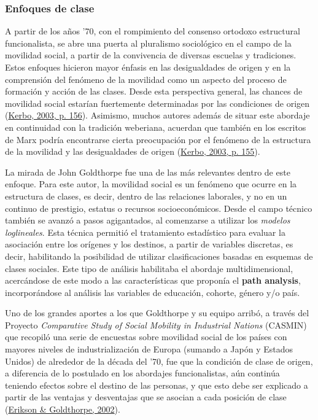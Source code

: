 \documentclass[
]{article}
\begin{document}
\hypertarget{enfoques-de-clase}{%
\subsubsection{Enfoques de clase}\label{enfoques-de-clase}}

A partir de los años '70, con el rompimiento del consenso ortodoxo estructural funcionalista, se abre una puerta al pluralismo sociológico en el campo de la movilidad social, a partir de la convivencia de diversas escuelas y tradiciones. Estos enfoques hicieron mayor énfasis en las desigualdades de origen y en la comprensión del fenómeno de la movilidad como un aspecto del proceso de formación y acción de las clases. Desde esta perspectiva general, las chances de movilidad social estarían fuertemente determinadas por las condiciones de origen (\protect\hyperlink{ref-Kerbo2003}{Kerbo, 2003, p. 156}). Asimismo, muchos autores además de situar este abordaje en continuidad con la tradición weberiana, acuerdan que también en los escritos de Marx podría encontrarse cierta preocupación por el fenómeno de la estructura de la movilidad y las desigualdades de origen (\protect\hyperlink{ref-Kerbo2003}{Kerbo, 2003, p. 155}).

La mirada de John Goldthorpe fue una de las más relevantes dentro de este enfoque. Para este autor, la movilidad social es un fenómeno que ocurre en la estructura de clases, es decir, dentro de las relaciones laborales, y no en un continuo de prestigio, estatus o recursos socioeconómicos. Desde el campo técnico también se avanzó a pasos agigantados, al comenzarse a utilizar los \emph{modelos loglineales}. Esta técnica permitió el tratamiento estadístico para evaluar la asociación entre los orígenes y los destinos, a partir de variables discretas, es decir, habilitando la posibilidad de utilizar clasificaciones basadas en esquemas de clases sociales. Este tipo de análisis habilitaba el abordaje multidimensional, acercándose de este modo a las características que proponía el \textbf{path analysis}, incorporándose al análisis las variables de educación, cohorte, género y/o país.

Uno de los grandes aportes a los que Goldthorpe y su equipo arribó, a través del Proyecto \emph{Comparative Study of Social Mobility in Industrial Nations} (CASMIN) que recopiló una serie de encuestas sobre movilidad social de los países con mayores niveles de industrialización de Europa (sumando a Japón y Estados Unidos) de alrededor de la década del '70, fue que la condición de clase de origen, a diferencia de lo postulado en los abordajes funcionalistas, aún continúa teniendo efectos sobre el destino de las personas, y que esto debe ser explicado a partir de las ventajas y desventajas que se asocian a cada posición de clase (\protect\hyperlink{ref-Erikson.Goldthorpe2002}{Erikson \& Goldthorpe, 2002}).
\end{document}

